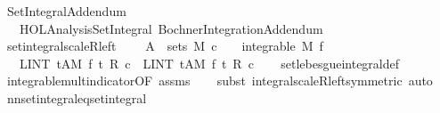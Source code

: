 %
\begin{isabellebody}%
%
%
\isadelimtheory
%
\endisadelimtheory
%
\isatagtheory
{}\isamarkupfalse%
\ Set{\isacharunderscore}{\kern0pt}Integral{\isacharunderscore}{\kern0pt}Addendum\isanewline
\ \ \ {\isachardoublequoteopen}HOL{\isacharminus}{\kern0pt}Analysis{\isachardot}{\kern0pt}Set{\isacharunderscore}{\kern0pt}Integral{\isachardoublequoteclose}\ Bochner{\isacharunderscore}{\kern0pt}Integration{\isacharunderscore}{\kern0pt}Addendum\isanewline
\ \ %
\endisatagtheory
{\isafoldtheory}%
%
\isadelimtheory
\isanewline
%
\endisadelimtheory
\isanewline
{}\isamarkupfalse%
\ set{\isacharunderscore}{\kern0pt}integral{\isacharunderscore}{\kern0pt}scaleR{\isacharunderscore}{\kern0pt}left{\isacharcolon}{\kern0pt}\ \isanewline
\ \ \ {\isachardoublequoteopen}A\ {\isasymin}\ sets\ M{\isachardoublequoteclose}\ {\isachardoublequoteopen}c\ {\isasymnoteq}\ {}\ {\isasymLongrightarrow}\ integrable\ M\ f{\isachardoublequoteclose}\isanewline
\ \ \ {\isachardoublequoteopen}LINT\ t{\isacharcolon}{\kern0pt}A{\isacharbar}{\kern0pt}M{\isachardot}{\kern0pt}\ f\ t\ {\isacharasterisk}{\kern0pt}\isactrlsub R\ c\ {\isacharequal}{\kern0pt}\ {\isacharparenleft}{\kern0pt}LINT\ t{\isacharcolon}{\kern0pt}A{\isacharbar}{\kern0pt}M{\isachardot}{\kern0pt}\ f\ t{\isacharparenright}{\kern0pt}\ {\isacharasterisk}{\kern0pt}\isactrlsub R\ c{\isachardoublequoteclose}\isanewline
%
\isadelimproof
\ \ %
\endisadelimproof
%
\isatagproof
{}\isamarkupfalse%
\ set{\isacharunderscore}{\kern0pt}lebesgue{\isacharunderscore}{\kern0pt}integral{\isacharunderscore}{\kern0pt}def\ \isanewline
\ \ \isamarkupfalse%
\ integrable{\isacharunderscore}{\kern0pt}mult{\isacharunderscore}{\kern0pt}indicator{\isacharbrackleft}{\kern0pt}OF\ assms{\isacharbrackright}{\kern0pt}\isanewline
\ \ \isamarkupfalse%
\ {\isacharparenleft}{\kern0pt}subst\ integral{\isacharunderscore}{\kern0pt}scaleR{\isacharunderscore}{\kern0pt}left{\isacharbrackleft}{\kern0pt}symmetric{\isacharbrackright}{\kern0pt}{\isacharcomma}{\kern0pt}\ auto{\isacharparenright}{\kern0pt}%
\endisatagproof
{\isafoldproof}%
%
\isadelimproof
\isanewline
%
\endisadelimproof
\isanewline
{}\isamarkupfalse%
\ nn{\isacharunderscore}{\kern0pt}set{\isacharunderscore}{\kern0pt}integral{\isacharunderscore}{\kern0pt}eq{\isacharunderscore}{\kern0pt}set{\isacharunderscore}{\kern0pt}integral{\isacharcolon}{\kern0pt}\isanewline

\end{isabellebody}
